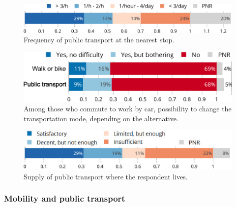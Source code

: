 \documentclass[english,5p,authoryear]{elsarticle}
\begin{document}
\begin{figure}[t]
\centering
\includegraphics[width=\columnwidth]{Images_EPS/transports_frequency_trim.eps}
\caption{Frequency of public transport at the nearest stop.}
\label{fig:transports_frequency}
\end{figure}

\begin{figure}[b]
\centering
\includegraphics[width=\columnwidth]{Images_EPS/transports_work.eps}
\caption{Among those who commute to work by car, possibility to change the transportation mode, depending on the alternative.}
\label{fig:transports_work}
\end{figure}
    
\begin{figure}[b]
\centering
\includegraphics[width=\columnwidth]{Images_EPS/transports_opinion_trim.eps}
\caption{Supply of public transport where the respondent lives.}
\label{fig:transports_opinion}
\end{figure}

    \subsubsection{Mobility and public transport}
\end{document}
